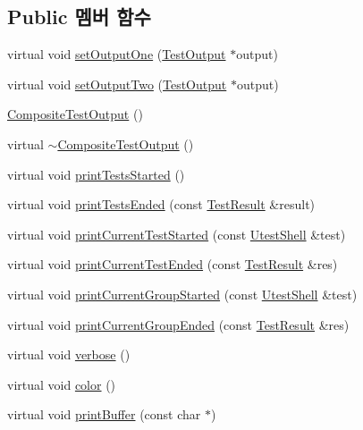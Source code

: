 \subsection*{Public 멤버 함수}
\begin{DoxyCompactItemize}
\item 
virtual void \hyperlink{class_composite_test_output_ab1980b05df41a434ded40d87cc00419e}{set\+Output\+One} (\hyperlink{class_test_output}{Test\+Output} $\ast$output)
\item 
virtual void \hyperlink{class_composite_test_output_a0cdc1d42356faf359e1491ff31773fd6}{set\+Output\+Two} (\hyperlink{class_test_output}{Test\+Output} $\ast$output)
\item 
\hyperlink{class_composite_test_output_a94f83f187b3fd7f92c334d352cc1bc3a}{Composite\+Test\+Output} ()
\item 
virtual \hyperlink{class_composite_test_output_a484657b2e1bd1e19d0c20a8d6d5f1fe4}{$\sim$\+Composite\+Test\+Output} ()
\item 
virtual void \hyperlink{class_composite_test_output_a1c2b129bfdc2b392ffa618864707dd89}{print\+Tests\+Started} ()
\item 
virtual void \hyperlink{class_composite_test_output_acc5ba82a215510b66f5f294258686dd4}{print\+Tests\+Ended} (const \hyperlink{class_test_result}{Test\+Result} \&result)
\item 
virtual void \hyperlink{class_composite_test_output_aa3e637e450766d2d1a6090f2bab8bf08}{print\+Current\+Test\+Started} (const \hyperlink{class_utest_shell}{Utest\+Shell} \&test)
\item 
virtual void \hyperlink{class_composite_test_output_a67acd3c53695126b4728c7da0d2b0b51}{print\+Current\+Test\+Ended} (const \hyperlink{class_test_result}{Test\+Result} \&res)
\item 
virtual void \hyperlink{class_composite_test_output_afe801c9e014df78dd6cd5e199ba8c6e0}{print\+Current\+Group\+Started} (const \hyperlink{class_utest_shell}{Utest\+Shell} \&test)
\item 
virtual void \hyperlink{class_composite_test_output_a037b2a87826c7f59e7353cb137deacae}{print\+Current\+Group\+Ended} (const \hyperlink{class_test_result}{Test\+Result} \&res)
\item 
virtual void \hyperlink{class_composite_test_output_a2ae0a8d48809abb33b5ba47c56fdc3ad}{verbose} ()
\item 
virtual void \hyperlink{class_composite_test_output_ae8d23f2d3de1d9d47d8139d54fb89640}{color} ()
\item 
virtual void \hyperlink{class_composite_test_output_a6840b2f395620a01207db9b9c9c5d1a8}{print\+Buffer} (const char $\ast$)

\end{DoxyCompactItemize}
